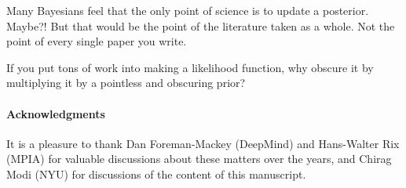 \documentclass{article}
\begin{document}
Many Bayesians feel that the only point of science is to update a posterior. Maybe?! But that would be the point of the literature taken as a whole. Not the point of every single paper you write.

If you put tons of work into making a likelihood function, why obscure it by multiplying it by a pointless and obscuring prior?

\paragraph{Acknowledgments}
It is a pleasure to thank
  Dan Foreman-Mackey (DeepMind) and
  Hans-Walter Rix (MPIA)
for valuable discussions about these matters over the years, and
  Chirag Modi (NYU)
for discussions of the content of this manuscript.

\raggedright


\end{document}

